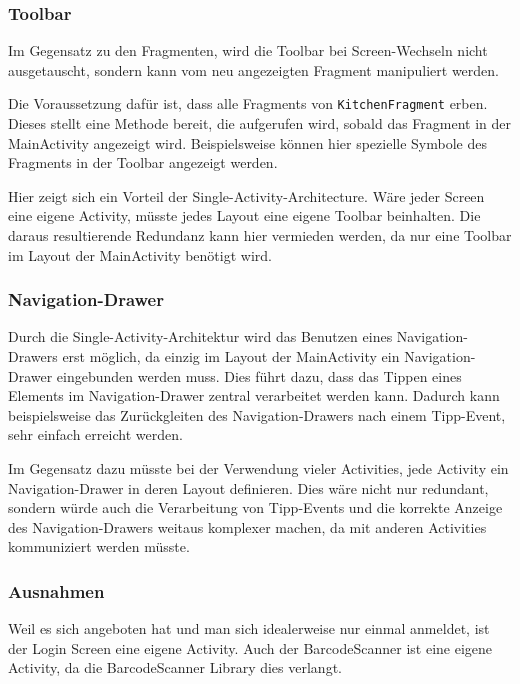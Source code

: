 

\subsubsection{Toolbar}

Im Gegensatz zu den Fragmenten, wird die Toolbar bei Screen-Wechseln nicht ausgetauscht, sondern kann vom neu angezeigten Fragment manipuliert werden.

Die Voraussetzung dafür ist, dass alle Fragments von \texttt{KitchenFragment} erben.
Dieses stellt eine Methode bereit, die aufgerufen wird, sobald das Fragment in der MainActivity angezeigt wird.
Beispielsweise können hier spezielle Symbole des Fragments in der Toolbar angezeigt werden.

Hier zeigt sich ein Vorteil der Single-Activity-Architecture.
Wäre jeder Screen eine eigene Activity, müsste jedes Layout eine eigene Toolbar beinhalten.
Die daraus resultierende Redundanz kann hier vermieden werden, da nur eine Toolbar im Layout der MainActivity benötigt wird.

\subsubsection{Navigation-Drawer}

Durch die Single-Activity-Architektur wird das Benutzen eines Navigation-Drawers erst möglich, da einzig im Layout der MainActivity ein Navigation-Drawer eingebunden werden muss.
Dies führt dazu, dass das Tippen eines Elements im Navigation-Drawer zentral verarbeitet werden kann.
Dadurch kann beispielsweise das Zurückgleiten des Navigation-Drawers nach einem Tipp-Event, sehr einfach erreicht werden.

Im Gegensatz dazu müsste bei der Verwendung vieler Activities, jede Activity ein Navigation-Drawer in deren Layout definieren.
Dies wäre nicht nur redundant, sondern würde auch die Verarbeitung von Tipp-Events und die korrekte Anzeige des Navigation-Drawers weitaus komplexer machen, da mit anderen Activities kommuniziert werden müsste.

\subsubsection{Ausnahmen}

Weil es sich angeboten hat und man sich idealerweise nur einmal anmeldet, ist der Login Screen eine eigene Activity.
Auch der BarcodeScanner ist eine eigene Activity, da die BarcodeScanner Library dies verlangt.

